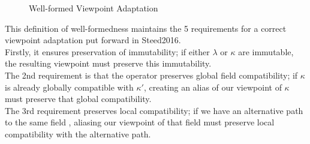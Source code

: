 \begin{figure}[H]
    \centering
    \begin{mathpar}
    \end{mathpar}
    \caption{Well-formed Viewpoint Adaptation}
    \label{fig:degen-view}
\end{figure}

This definition of well-formedness maintains the 5 requirements for a correct viewpoint adaptation put forward in Steed2016. \\

Firstly, it ensures preservation of immutability; if either $\lambda$ or $\kappa$ are immutable, the resulting viewpoint must preserve this immutability. \\

The 2nd requirement is that the operator preserves global field compatibility; if $\kappa$ is already globally compatible with $\kappa'$, creating an alias of our viewpoint of $\kappa$ must preserve that global compatibility. \\

The 3rd requirement preserves local compatibility; if we have an alternative path to the same field , aliasing our viewpoint of that field must preserve local compatibility with the alternative path. \\

